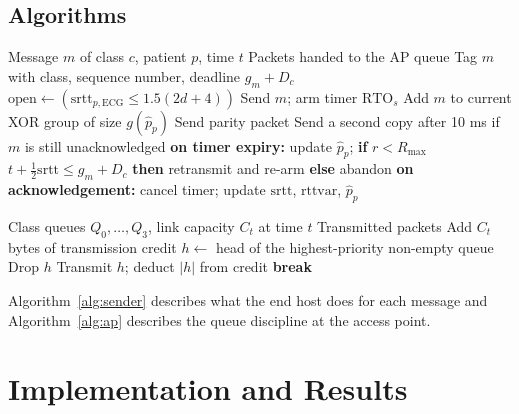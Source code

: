 \documentclass[10pt,twocolumn,letterpaper]{article}
\begin{document}
\subsection{Algorithms}
\begin{algorithm}[t]
\caption{Sender-side message handling}
\label{alg:sender}
\begin{algorithmic}[1]
\REQUIRE Message $m$ of class $c$, patient $p$, time $t$
\ENSURE Packets handed to the AP queue
\STATE Tag $m$ with class, sequence number, deadline $g_m+D_c$
\STATE $\mathrm{open}\leftarrow\left(\mathrm{srtt}_{p,\mathrm{ECG}}\le 1.5(2d+4)\right)$ 
\STATE Send $m$; arm timer $\mathrm{RTO}_s$
  \STATE Add $m$ to current XOR group of size $g(\hat p_p)$
  \STATE Send parity packet \ENDIF
{}
  \STATE Send a second copy after 10 ms if $m$ is still unacknowledged
\ENDIF
\STATE \textbf{on timer expiry:} update $\hat p_p$; \textbf{if} $r<R_{\max}$ \AND $t+\tfrac12\mathrm{srtt}\le g_m+D_c$ \textbf{then} retransmit and re-arm \textbf{else} abandon
\STATE \textbf{on acknowledgement:} cancel timer; update $\mathrm{srtt}$, $\mathrm{rttvar}$, $\hat p_p$
\end{algorithmic}
\end{algorithm}

\begin{algorithm}[t]
\caption{Access-point queue service}
\label{alg:ap}
\begin{algorithmic}[1]
\REQUIRE Class queues $Q_0,\dots,Q_3$, link capacity $C_t$ at time $t$
\ENSURE Transmitted packets
\STATE Add $C_t$ bytes of transmission credit
  \STATE $h\leftarrow$ head of the highest-priority non-empty queue
    \STATE Drop $h$ 
    \STATE Transmit $h$; deduct $|h|$ from credit
  \ELSE \STATE \textbf{break}
  \ENDIF
\ENDWHILE
\end{algorithmic}
\end{algorithm}

Algorithm~\ref{alg:sender} describes what the end host does for each message and Algorithm~\ref{alg:ap} describes the queue discipline at the access point.

\section{Implementation and Results}
\end{document}
